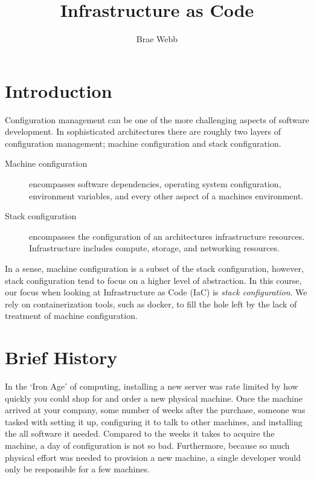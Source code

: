 \title{Infrastructure as Code}
\author{Brae Webb}
\date{}

\maketitle

\section{Introduction}
Configuration management can be one of the more challenging aspects of software development.
In sophisticated architectures there are roughly two layers of configuration management;
machine configuration and stack configuration.

\begin{description}
    \item[Machine configuration] encompasses software dependencies, operating system configuration, environment variables,
    and every other aspect of a machines environment.
    \item[Stack configuration] encompasses the configuration of an architectures infrastructure resources.
    Infrastructure includes compute, storage, and networking resources.
\end{description}

In a sense, machine configuration is a subset of the stack configuration, however,
stack configuration tend to focus on a higher level of abstraction.
In this course, our focus when looking at Infrastructure as Code (IaC) is \textsl{stack configuration}.
We rely on containerization tools, such as docker, to fill the hole left by the lack of treatment of machine configuration.

\section{Brief History}
In the `Iron Age' of computing, installing a new server was rate limited by how quickly you could shop for and order a new physical machine.
Once the machine arrived at your company,
some number of weeks after the purchase,
someone was tasked with setting it up,
configuring it to talk to other machines,
and installing the all software it needed.
Compared to the weeks it takes to acquire the machine,
a day of configuration is not so bad.
Furthermore, because so much physical effort was needed to provision a new machine,
a single developer would only be responsible for a few machines.

